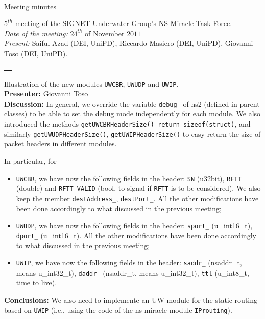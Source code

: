 \documentclass[11pt,journal,draftclsnofoot,onecolumn,twoside,letterpaper]{IEEEtran}
\theoremstyle{definition} \newtheorem{definition}[]{Definition}
\theoremstyle{theorem} \newtheorem{theorem}[]{Theorem}
\begin{document}
\pagestyle{empty}

\begin{Large} \\ \end{Large}
\begin{large} {Meeting minutes} \end{large}

\vspace{0.8cm}

 $5^{th}$ meeting of the SIGNET Underwater Group's NS-Miracle Task Force.\\
{\it Date of the meeting: } $24^{th}$ of November $2011$\\
{\it Present: } Saiful Azad (DEI, UniPD), Riccardo Masiero (DEI, UniPD), Giovanni Toso (DEI, UniPD).

\vspace{0.5cm}

\begin{tabular}{p{}}
 \hline \\
\end{tabular}

 Illustration of the new modules {\tt UWCBR}, {\tt UWUDP} and {\tt UWIP}.\\
{\bf Presenter:} Giovanni Toso\\
{\bf Discussion:} 
In general, we override the variable {\tt debug\_} of ns2 (defined in parent classes) to be able to set the debug mode independently for each module. We also introduced the methods {\tt getUWCBRHeaderSize() {return sizeof(struct)}}, and similarly {\tt getUWUDPHeaderSize()}, {\tt  getUWIPHeaderSize()} to easy return the size of packet headers in different modules.

In particular, for
\begin{itemize}
 \item {\tt UWCBR}, we have now the following fields in the header: {\tt SN} (u32bit), {\tt RFTT} (double) and {\tt RFTT\_VALID} (bool, to signal if {\tt RFTT} is to be considered). We also keep the member {\tt destAddress\_}, {\tt destPort\_}. All the other modifications have been done accordingly to what discussed in the previous meeting;
 \item {\tt UWUDP}, we have now the following fields in the header: {\tt sport\_} (u\_int16\_t), {\tt dport\_} (u\_int16\_t).  All the other modifications have been done accordingly to what discussed in the previous meeting;
 \item {\tt UWIP}, we have now the following fields in the header: {\tt saddr\_} (nsaddr\_t, means u\_int32\_t), {\tt daddr\_} (nsaddr\_t, means u\_int32\_t), {\tt ttl} (u\_int8\_t, time to live).
\end{itemize}
{\bf Conclusions:} 
We also need to implemente an UW module for the static routing based on {\tt UWIP} (i.e., using the code of the ns-miracle module {\tt IProuting}).
\end{document}
